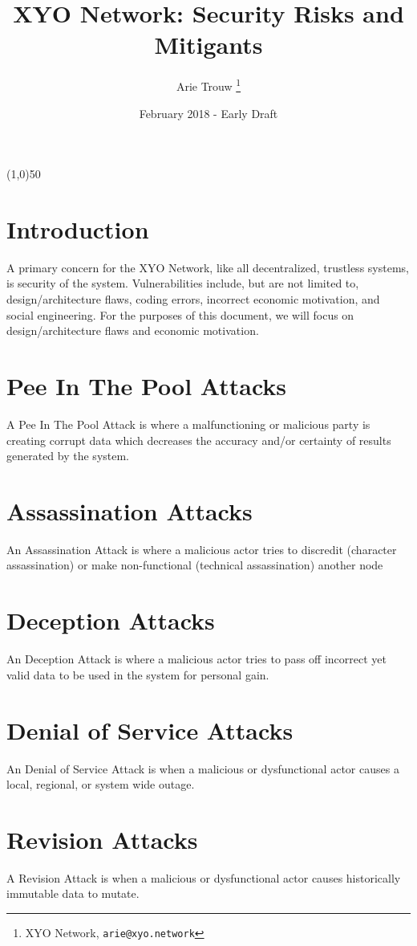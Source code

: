 \documentclass{article}
\title {XYO Network: Security Risks and Mitigants}
\author{
    Arie Trouw
        \thanks{XYO Network, \texttt{arie@xyo.network}}
}
\date{February 2018 - Early Draft}
\begin{document}
\pagecolor{lightred}

\maketitle

\begin{center}
\line(1,0){50}
\end{center}

\section{Introduction}
A primary concern for the XYO Network, like all decentralized, trustless systems, is security of the system.  Vulnerabilities include, but are not limited to, design/architecture flaws, coding errors, incorrect economic motivation, and social engineering. For the purposes of this document, we will focus on design/architecture flaws and economic motivation.

\section{Pee In The Pool Attacks}
A Pee In The Pool Attack is where a malfunctioning or malicious party is creating corrupt data which decreases the accuracy and/or certainty of results generated by the system.

\section{Assassination Attacks}
An Assassination Attack is where a malicious actor tries to discredit (character assassination) or make non-functional (technical assassination) another node

\section{Deception Attacks}
An Deception Attack is where a malicious actor tries to pass off incorrect yet valid data to be used in the system for personal gain.

\section{Denial of Service Attacks}
An Denial of Service Attack is when a malicious or dysfunctional actor causes a local, regional, or system wide outage.

\section{Revision Attacks}
A Revision Attack is when a malicious or dysfunctional actor causes historically immutable data to mutate.
\end{document}
